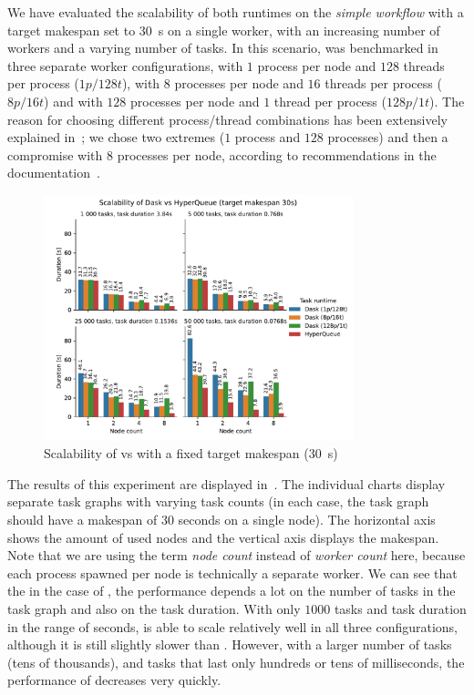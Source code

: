 We have evaluated the scalability of both runtimes on the \emph{simple workflow} with a target
makespan set to \SI{30}{\second} on a single worker, with an increasing number of workers
and a varying number of tasks. In this scenario, \dask{} was benchmarked in three
separate worker configurations, with $1$ process per node and
$128$ threads per process ($1p/128t$), with $8$
processes per node and $16$ threads per process ($8p/16t$) and
with $128$ processes per node and $1$ thread per process
($128p/1t$). The reason for choosing different process/thread combinations has been
extensively explained in~; we chose two extremes ($1$
process and $128$ processes) and then a compromise with $8$
processes per node, according to recommendations in the \dask{}
documentation~\cite{dask-thread-recommendation}.

\begin{figure}[h]
	\centering
	\includegraphics[width=0.8\textwidth]{imgs/hq/charts/dask-vs-hq-sleep}
	\caption{Scalability of \hyperqueue{} vs \dask{} with a fixed target makespan
	(\SI{30}{\second})}
	\label{fig:hq-dask-sleep}
\end{figure}

The results of this experiment are displayed in~. The individual charts
display separate task graphs with varying task counts (in each case, the task graph should have a
makespan of $30$ seconds on a single node). The horizontal axis shows the amount
of used nodes and the vertical axis displays the makespan. Note that we are using the term
\emph{node count} instead of \emph{worker count} here, because each
\dask{} process spawned per node is technically a separate worker. We can see that
the in the case of \dask{}, the performance depends a lot on the number of tasks in
the task graph and also on the task duration. With only $1000$ tasks and task
duration in the range of seconds, \dask{} is able to scale relatively well in all
three configurations, although it is still slightly slower than \hyperqueue{}. However,
with a larger number of tasks (tens of thousands), and tasks that last only hundreds or tens of
milliseconds, the performance of \dask{} decreases very quickly.

